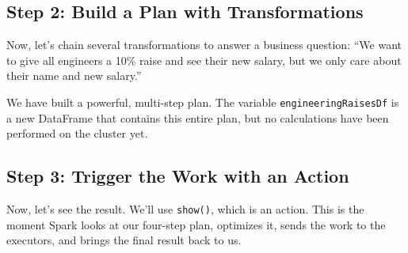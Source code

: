 \documentclass[
  letterpaper,
  DIV=11,
  numbers=noendperiod]{scrreprt}
\newenvironment{Shaded}{\begin{snugshade}}{\end{snugshade}}
\newcommand{\CommentTok}[1]{\textcolor[rgb]{0.37,0.37,0.37}{#1}}
\newcommand{\FloatTok}[1]{\textcolor[rgb]{0.68,0.00,0.00}{#1}}
\newcommand{\FunctionTok}[1]{\textcolor[rgb]{0.28,0.35,0.67}{#1}}
\newcommand{\KeywordTok}[1]{\textcolor[rgb]{0.00,0.23,0.31}{\textbf{#1}}}
\newcommand{\NormalTok}[1]{\textcolor[rgb]{0.00,0.23,0.31}{#1}}
\newcommand{\OperatorTok}[1]{\textcolor[rgb]{0.37,0.37,0.37}{#1}}
\newcommand{\StringTok}[1]{\textcolor[rgb]{0.13,0.47,0.30}{#1}}
\begin{document}
\subsection{Step 2: Build a Plan with
Transformations}\label{step-2-build-a-plan-with-transformations}

Now, let's chain several transformations to answer a business question:
``We want to give all engineers a 10\% raise and see their new salary,
but we only care about their name and new salary.''

\begin{Shaded}
\end{Shaded}

We have built a powerful, multi-step plan. The variable
\texttt{engineeringRaisesDf} is a new DataFrame that contains this
entire plan, but no calculations have been performed on the cluster yet.

\subsection{Step 3: Trigger the Work with an
Action}\label{step-3-trigger-the-work-with-an-action}

Now, let's see the result. We'll use \texttt{show()}, which is an
action. This is the moment Spark looks at our four-step plan, optimizes
it, sends the work to the executors, and brings the final result back to
us.
\end{document}
